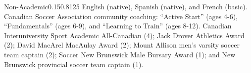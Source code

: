 \documentclass{federico_cv}
\begin{document}
\begin{tblSection}{Non-Academic}{0.15}{0.8125}
{English (native), Spanish (native), and French (basic).}
{Canadian Soccer Association community coaching: ``Active Start'' (ages 4-6), 
``Fundamentals'' (ages 6-9), and ``Learning to Train'' (ages 8-12).}
{Canadian Interuniversity Sport Academic All-Canadian (4); Jack Drover Athletics 
Award (2); David MacArel MacAulay Award (2); Mount Allison men's varsity soccer 
team captain (2); Soccer New Brunswick Male Bursary Award (1); and New Brunswick 
provincial soccer team captain (1).}
\end{tblSection}
\end{document}
